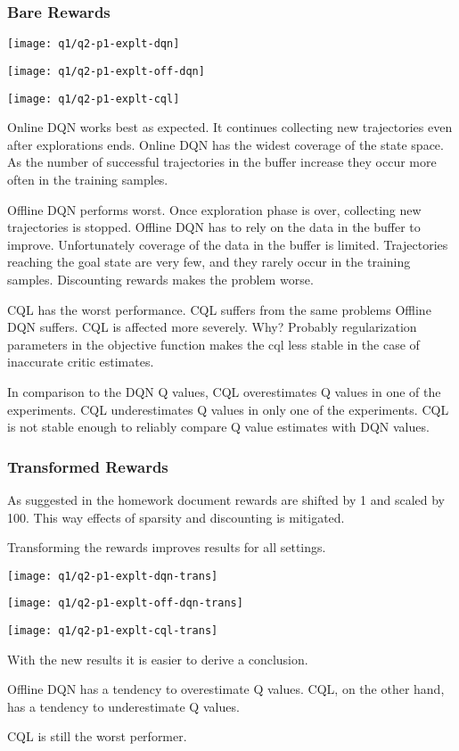 \documentclass[11pt]{article}
\begin{document}
    \subsubsection*{Bare Rewards}

    \hspace*{-0.4in}
    \texttt{[image: q1/q2-p1-explt-dqn]}

    \hspace*{-0.6in}
    \texttt{[image: q1/q2-p1-explt-off-dqn]}

    \hspace*{-0.6in}
    \texttt{[image: q1/q2-p1-explt-cql]}

    Online DQN works best as expected.
    It continues collecting new trajectories even after explorations ends.
    Online DQN has the widest coverage of the state space.
    As the number of successful trajectories in the buffer increase they occur more often in the training samples.

    Offline DQN performs worst.
    Once exploration phase is over, collecting new trajectories is stopped.
    Offline DQN has to rely on the data in the buffer to improve.
    Unfortunately coverage of the data in the buffer is limited.
    Trajectories reaching the goal state are very few, and they rarely occur in the training samples.
    Discounting rewards makes the problem worse.

    CQL has the worst performance.
    CQL suffers from the same problems Offline DQN suffers.
    CQL is affected more severely.
    Why?
    Probably regularization parameters in the objective function makes the cql less stable in the case of inaccurate critic estimates.

    In comparison to the DQN Q values, CQL overestimates Q values in one of the experiments.
    CQL underestimates Q values in only one of the experiments.
    CQL is not stable enough to reliably compare Q value estimates with DQN values.

    \subsubsection*{Transformed Rewards}

    As suggested in the homework document rewards are shifted by 1 and scaled by 100.
    This way effects of sparsity and discounting is mitigated.

    Transforming the rewards improves results for all settings.

    \hspace*{-0.6in}
    \texttt{[image: q1/q2-p1-explt-dqn-trans]}

    \hspace*{-0.6in}
    \texttt{[image: q1/q2-p1-explt-off-dqn-trans]}

    \hspace*{-0.6in}
    \texttt{[image: q1/q2-p1-explt-cql-trans]}

    With the new results it is easier to derive a conclusion.

    Offline DQN has a tendency to overestimate Q values.
    CQL, on the other hand, has a tendency to underestimate Q values.

    CQL is still the worst performer.
\end{document}
